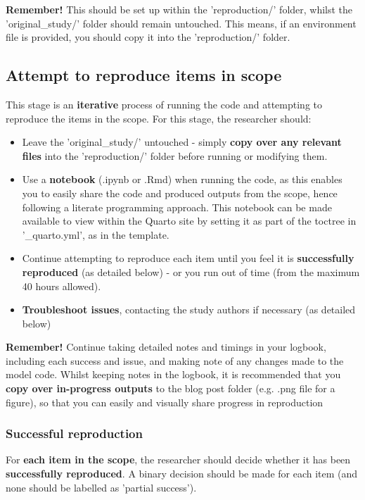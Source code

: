 \textbf{Remember!} This should be set up within the 'reproduction/' folder, whilst the 'original\_study/' folder should remain untouched. This means, if an environment file is provided, you should copy it into the 'reproduction/' folder.

\vspace{0.5cm}
\subsection{Attempt to reproduce items in scope}

This stage is an \textbf{iterative} process of running the code and attempting to reproduce the items in the scope. For this stage, the researcher should:
\begin{itemize}
    \item Leave the 'original\_study/' untouched - simply \textbf{copy over any relevant files} into the 'reproduction/' folder before running or modifying them.
    \item Use a \textbf{notebook} (.ipynb or .Rmd) when running the code, as this enables you to easily share the code and produced outputs from the scope, hence following a literate programming approach. This notebook can be made available to view within the Quarto site by setting it as part of the toctree in '\_quarto.yml', as in the template.
    \item Continue attempting to reproduce each item until you feel it is \textbf{successfully reproduced} (as detailed below) - or you run out of time (from the maximum 40 hours allowed).
    \item \textbf{Troubleshoot issues}, contacting the study authors if necessary (as detailed below)
\end{itemize}

\textbf{Remember!} Continue taking detailed notes and timings in your logbook, including each success and issue, and making note of any changes made to the model code. Whilst keeping notes in the logbook, it is recommended that you \textbf{copy over in-progress outputs} to the blog post folder (e.g. .png file for a figure), so that you can easily and visually share progress in reproduction

\vspace{0.5cm}
\subsubsection{Successful reproduction}

For \textbf{each item in the scope}, the researcher should decide whether it has been \textbf{successfully reproduced}. A binary decision should be made for each item (and none should be labelled as 'partial success').

